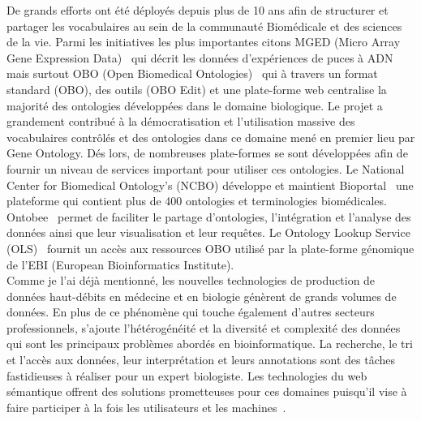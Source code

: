 De grands efforts ont été déployés depuis plus de 10 ans afin de structurer et partager les vocabulaires au sein de la communauté Biomédicale et des sciences de la vie. Parmi les initiatives les plus importantes citons MGED (Micro Array Gene Expression Data)~\cite{Whetzel2006} qui décrit les données d’expériences de puces à ADN mais surtout OBO (Open Biomedical Ontologies)~\cite{Smith2007,Golbreich2007,Tirmizi2011} qui à travers un format standard (OBO), des outils (OBO Edit) et une plate-forme web centralise la majorité des ontologies développées dans le domaine biologique. Le projet a grandement contribué à la démocratisation et l'utilisation massive des vocabulaires contrôlés et des ontologies dans ce domaine mené en premier lieu par Gene Ontology. Dés lors, de nombreuses plate-formes se sont développées afin de fournir un niveau de services important pour utiliser ces ontologies.  Le National Center for Biomedical Ontology’s (NCBO) développe et maintient Bioportal~\cite{Noy2009} une plateforme qui contient plus de 400 ontologies et terminologies biomédicales. Ontobee~\cite{Ong2016} permet de faciliter le partage d’ontologies, l’intégration et l’analyse des données ainsi que leur visualisation et leur requêtes. Le Ontology Lookup Service (OLS)~\cite{Cote2006} fournit un accès aux ressources OBO utilisé par la plate-forme génomique de l'EBI (European Bioinformatics Institute).\\

Comme je l'ai déjà mentionné, les nouvelles technologies de production de données haut-débits en médecine et en biologie génèrent de grands volumes de données. En plus de ce phénomène qui touche également d'autres secteurs professionnels, s'ajoute l’hétérogénéité et la diversité et complexité des données qui sont les principaux problèmes abordés en bioinformatique. La recherche, le tri et l’accès aux données, leur interprétation et leurs annotations sont des tâches fastidieuses à réaliser pour un expert biologiste.  Les technologies du web sémantique offrent des solutions prometteuses pour ces domaines puisqu'il vise à faire participer à la fois les utilisateurs et les machines~\cite{berners2001semweb}.\\

